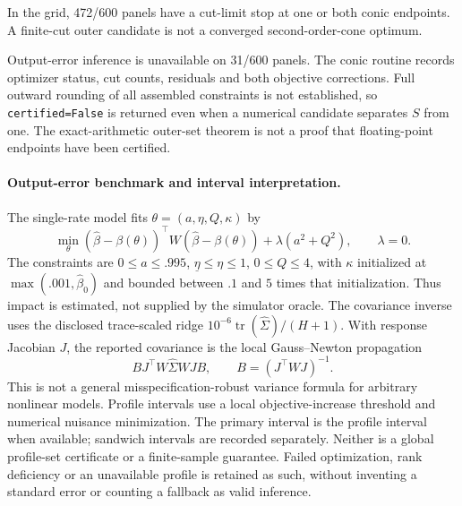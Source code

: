In the grid, 472/600 panels have a cut-limit stop at one or both conic endpoints. A finite-cut outer candidate is not a converged second-order-cone optimum.


Output-error inference is unavailable on 31/600 panels. The conic routine records optimizer status, cut counts, residuals and both
objective corrections. Full outward rounding of all assembled constraints is
not established, so \texttt{certified=False} is returned even when a numerical
candidate separates $S$ from one. The exact-arithmetic outer-set theorem is
not a proof that floating-point endpoints have been certified.

\paragraph{Output-error benchmark and interval interpretation.}
The single-rate model fits $\theta=(a,\eta,Q,\kappa)$ by
\begin{equation}
 \min_\theta (\hat\beta-\beta(\theta))^\top W(\hat\beta-\beta(\theta))
       +\lambda(a^2+Q^2),\qquad \lambda=0.
 \label{eq:output_error_obj}
\end{equation}
The constraints are $0\le a\le.995$, $\underline\eta\le\eta\le1$,
$0\le Q\le4$, with $\kappa$ initialized at $\max(.001,\hat\beta_0)$
and bounded between $.1$ and $5$ times that initialization. Thus impact is
estimated, not supplied by the simulator oracle. The covariance inverse uses
the disclosed trace-scaled ridge $10^{-6}\operatorname{tr}(\widehat\Sigma)/(H+1)$.
With response Jacobian $J$, the reported covariance is the local
Gauss--Newton propagation
\[
 B J^\top W\widehat\Sigma WJ B,\qquad B=(J^\top WJ)^{-1}.
\]
This is not a general misspecification-robust variance formula for arbitrary
nonlinear models. Profile intervals use a local objective-increase threshold
and numerical nuisance minimization. The primary interval is the profile
interval when available; sandwich intervals are recorded separately. Neither
is a global profile-set certificate or a finite-sample guarantee. Failed
optimization, rank deficiency or an unavailable profile is retained as such,
without inventing a standard error or counting a fallback as valid inference.


